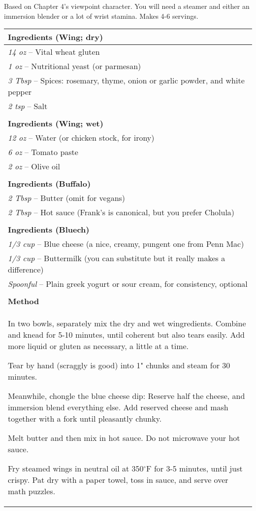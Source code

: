 \documentclass[12pt]{article}
\begin{document}
Based on Chapter 4's viewpoint character.
You will need a steamer and either an immersion blender or a lot of wrist stamina.
Makes 4-6 servings.

\vspace{1em}

\noindent \begin{tabular}{p{}}
	{\bf Ingredients (Wing; dry)} \\
	\hline
	{\em 14 oz} -- Vital wheat gluten \\
	{\em 1 oz} -- Nutritional yeast (or parmesan) \\
	{\em 3 Tbsp} -- Spices: rosemary, thyme, onion or garlic powder, and white pepper \\
	{\em 2 tsp} -- Salt \\
	\\
	{\bf Ingredients (Wing; wet)} \\
	\hline
	{\em 12 oz} -- Water (or chicken stock, for irony) \\
	{\em 6 oz} -- Tomato paste \\
	{\em 2 oz} -- Olive oil \\
	\\
	{\bf Ingredients (Buffalo)} \\
	\hline
	{\em 2 Tbsp} -- Butter (omit for vegans) \\
	{\em 2 Tbsp} -- Hot sauce (Frank's is canonical, but you prefer Cholula) \\
	\\
	{\bf Ingredients (Bluech)} \\
	\hline
	{\em 1/3 cup} -- Blue cheese (a nice, creamy, pungent one from Penn Mac) \\
	{\em 1/3 cup} -- Buttermilk (you can substitute but it really makes a difference) \\
	{\em Spoonful} -- Plain greek yogurt or sour cream, for consistency, optional \\
	\\
	{\bf Method} \\
	\hline
\setlength{\parskip}{0.5em}
	In two bowls, separately mix the dry and wet wingredients. Combine and knead for 5-10 minutes, until coherent but also tears easily. Add more liquid or gluten as necessary, a little at a time.

	Tear by hand (scraggly is good) into 1" chunks and steam for 30 minutes.

	Meanwhile, chongle the blue cheese dip: Reserve half the cheese, and immersion blend everything else. Add reserved cheese and mash together with a fork until pleasantly chunky.

	Melt butter and then mix in hot sauce. Do not microwave your hot sauce.

	Fry steamed wings in neutral oil at 350$^{\circ}$F for 3-5 minutes, until just crispy. Pat dry with a paper towel, toss in sauce, and serve over math puzzles.
\end{tabular}
\end{document}
